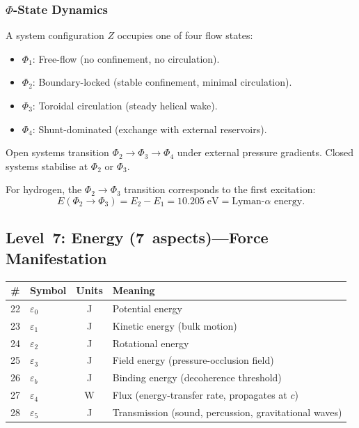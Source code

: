 \subsubsection{$\Phi$-State Dynamics}

A system configuration $Z$ occupies one of four flow states:
\begin{itemize}
  \item $\Phi_1$: Free-flow (no confinement, no circulation).
  \item $\Phi_2$: Boundary-locked (stable confinement, minimal circulation).
  \item $\Phi_3$: Toroidal circulation (steady helical wake).
  \item $\Phi_4$: Shunt-dominated (exchange with external reservoirs).
\end{itemize}

Open systems transition $\Phi_2 \to \Phi_3 \to \Phi_4$ under external pressure gradients.  Closed systems stabilise at $\Phi_2$ or $\Phi_3$.

For hydrogen, the $\Phi_2 \to \Phi_3$ transition corresponds to the first excitation:
\begin{equation}
  E(\Phi_2 \to \Phi_3) = E_2 - E_1 = 10.205\;\text{eV} = \text{Lyman-}\alpha\text{ energy.}
\end{equation}


\subsection{Level~7: Energy (7~aspects)---Force Manifestation}

\begin{center}
\begin{tabular}{clcl}
\hline
\# & Symbol & Units & Meaning \\
\hline
22 & $\varepsilon_0$ & J & Potential energy \\
23 & $\varepsilon_1$ & J & Kinetic energy (bulk motion) \\
24 & $\varepsilon_2$ & J & Rotational energy \\
25 & $\varepsilon_3$ & J & Field energy (pressure-occlusion field) \\
26 & $\varepsilon_b$ & J & Binding energy (decoherence threshold) \\
27 & $\varepsilon_4$ & W & Flux (energy-transfer rate, propagates at $c$) \\
28 & $\varepsilon_5$ & J & Transmission (sound, percussion, gravitational waves) \\
\hline
\end{tabular}
\end{center}

